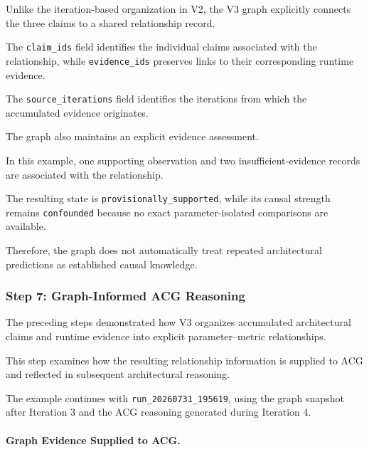 Unlike the iteration-based organization
in V2, the V3 graph explicitly connects
the three claims to a shared
relationship record.

The \texttt{claim\_ids} field identifies
the individual claims associated with
the relationship, while
\texttt{evidence\_ids} preserves links
to their corresponding runtime evidence.

The \texttt{source\_iterations} field
identifies the iterations from which
the accumulated evidence originates.

The graph also maintains an explicit
evidence assessment.

In this example, one supporting
observation and two insufficient-evidence
records are associated with the
relationship.

The resulting state is
\texttt{provisionally\_supported},
while its causal strength remains
\texttt{confounded} because no exact
parameter-isolated comparisons
are available.

Therefore, the graph does not
automatically treat repeated
architectural predictions as
established causal knowledge.






\subsubsection{Step 7: Graph-Informed ACG Reasoning}

The preceding steps demonstrated how V3
organizes accumulated architectural claims
and runtime evidence into explicit
parameter--metric relationships.

This step examines how the resulting
relationship information is supplied
to ACG and reflected in subsequent
architectural reasoning.

The example continues with
\texttt{run\_20260731\_195619},
using the graph snapshot after
Iteration 3 and the ACG reasoning
generated during Iteration 4.

\paragraph{Graph Evidence Supplied to ACG.}

